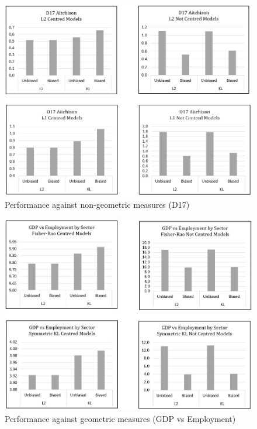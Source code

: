 \documentclass[BSc]{usydthesis}
\numberwithin{equation}{chapter}
\theoremstyle{remark}
\begin{document}
\begin{figure}
 \centering
 \includegraphics[scale=0.6,keepaspectratio=true]{graphs/G-D17-2.JPG}
 \caption{Performance against non-geometric measures (D17)}
\end{figure}

\newpage

\begin{figure}
 \centering
 \includegraphics[scale=0.6,keepaspectratio=true]{graphs/G-GDP1.JPG}
 \caption{Performance against geometric measures (GDP vs Employment)}
\end{figure}
\end{document}
